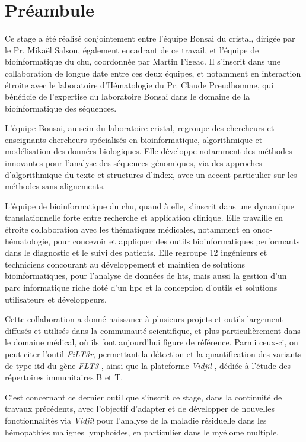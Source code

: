 \chapter{Préambule}

Ce stage a été réalisé conjointement entre l'équipe Bonsai du \gls{cristal}, 
dirigée par le Pr. Mikaël Salson, également encadrant de ce travail, 
et l'équipe de bioinformatique du \gls{chu}, coordonnée par Martin Figeac. 
Il s'inscrit dans une collaboration de longue date entre ces deux équipes, 
et notamment en interaction étroite avec le laboratoire d'Hématologie du Pr. Claude Preudhomme, 
qui bénéficie de l'expertise du laboratoire Bonsai dans le domaine de la bioinformatique 
des séquences.

L'équipe Bonsai, au sein du laboratoire \gls{cristal}, regroupe des chercheurs et enseignants-chercheurs
spécialisés en bioinformatique, algorithmique et modélisation des données biologiques. 
Elle développe notamment des méthodes innovantes pour l'analyse des séquences génomiques, 
via des approches d'algorithmique du texte et structures d'index, avec un accent particulier 
sur les méthodes sans alignements. 

L'équipe de bioinformatique du \gls{chu}, quand à elle, 
s'inscrit dans une dynamique translationnelle forte entre recherche et application clinique. 
Elle travaille en étroite collaboration avec les thématiques médicales, notamment en onco-hématologie, 
pour concevoir et appliquer des outils bioinformatiques performants dans le diagnostic et le suivi des patients.
Elle regroupe 12 ingénieurs et techniciens concourant au développement et maintien de solutions bioinformatiques,
pour l'analyse de données de \gls{hts}, mais aussi la gestion d'un parc informatique riche doté 
d'un \gls{hpc} et la conception d'outils et solutions utilisateurs et développeurs.

Cette collaboration a donné naissance à plusieurs projets et outils 
largement diffusés et utilisés dans la communauté scientifique, 
et plus particulièrement dans le domaine médical, où ils font aujourd'hui figure de référence. 
Parmi ceux-ci, on peut citer l'outil \textit{FiLT3r}, permettant la détection 
et la quantification des variants de type \gls{itd} du gène \textit{FLT3} \cite{boudryFrugalAlignmentfreeIdentification2022}, 
ainsi que la plateforme \textit{Vidjil} \cite{duezVidjilWebPlatform2016}, dédiée à l'étude des répertoires immunitaires B et T.

C'est concernant ce dernier outil que s'inscrit ce stage, dans la continuité de travaux précédents,
avec l'objectif d'adapter et de développer de nouvelles fonctionnalités via \textit{Vidjil} 
pour l'analyse de la maladie résiduelle dans les hémopathies malignes lymphoïdes, en particulier dans le myélome multiple.